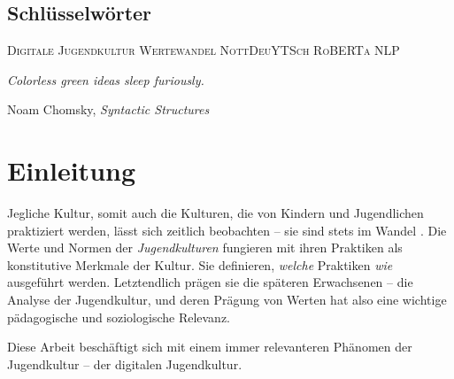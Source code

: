 \begin{titlepage}
    \subsection*{Schlüsselwörter}
    \scshape
    \hfill Digitale Jugendkultur \hfill Wertewandel \hfill NottDeuYTSch \hfill RoBERTa \hfill NLP \hfill \hfill

    \vfill
    \upshape
    \epigraph{\emph{Colorless green ideas sleep furiously.}}{Noam Chomsky, \emph{Syntactic Structures}}

    \newpage
    \thispagestyle{empty}

    \tableofcontents
\end{titlepage}

\pagestyle{fancy}

\section{Einleitung} \label{sec:1}
Jegliche Kultur, somit auch die Kulturen, die von Kindern und Jugendlichen praktiziert werden, lässt sich zeitlich beobachten -- sie sind stets im Wandel \autocite{KWV21}.
Die Werte und Normen der \emph{Jugendkulturen} fungieren mit ihren Praktiken als konstitutive Merkmale der Kultur.
Sie definieren, \emph{welche} Praktiken \emph{wie} ausgeführt werden.
Letztendlich prägen sie die späteren Erwachsenen -- die Analyse der Jugendkultur, und deren Prägung von Werten hat also eine wichtige pädagogische und soziologische Relevanz.

Diese Arbeit beschäftigt sich mit einem immer relevanteren Phänomen der Jugendkultur -- der digitalen Jugendkultur.

